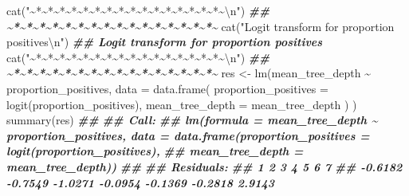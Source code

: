 \documentclass[
  11pt,
  oneside]{book}
\newenvironment{Shaded}{\begin{snugshade}}{\end{snugshade}}
\newcommand{\AttributeTok}[1]{\textcolor[rgb]{0.77,0.63,0.00}{#1}}
\newcommand{\DocumentationTok}[1]{\textcolor[rgb]{0.56,0.35,0.01}{\textbf{\textit{#1}}}}
\newcommand{\FunctionTok}[1]{\textcolor[rgb]{0.00,0.00,0.00}{#1}}
\newcommand{\NormalTok}[1]{#1}
\newcommand{\OtherTok}[1]{\textcolor[rgb]{0.56,0.35,0.01}{#1}}
\newcommand{\SpecialCharTok}[1]{\textcolor[rgb]{0.00,0.00,0.00}{#1}}
\newcommand{\StringTok}[1]{\textcolor[rgb]{0.31,0.60,0.02}{#1}}
\begin{document}
\begin{Shaded}
\begin{Highlighting}[]
\FunctionTok{cat}\NormalTok{(}\StringTok{"\textasciitilde{}*\textasciitilde{}*\textasciitilde{}*\textasciitilde{}*\textasciitilde{}*\textasciitilde{}*\textasciitilde{}*\textasciitilde{}*\textasciitilde{}*\textasciitilde{}*\textasciitilde{}*\textasciitilde{}*\textasciitilde{}*\textasciitilde{}*\textasciitilde{}*\textasciitilde{}*\textasciitilde{}}\SpecialCharTok{\textbackslash{}n}\StringTok{"}\NormalTok{)}
\DocumentationTok{\#\# \textasciitilde{}*\textasciitilde{}*\textasciitilde{}*\textasciitilde{}*\textasciitilde{}*\textasciitilde{}*\textasciitilde{}*\textasciitilde{}*\textasciitilde{}*\textasciitilde{}*\textasciitilde{}*\textasciitilde{}*\textasciitilde{}*\textasciitilde{}*\textasciitilde{}*\textasciitilde{}*\textasciitilde{}}
\FunctionTok{cat}\NormalTok{(}\StringTok{"Logit transform for proportion positives}\SpecialCharTok{\textbackslash{}n}\StringTok{"}\NormalTok{)}
\DocumentationTok{\#\# Logit transform for proportion positives}
\FunctionTok{cat}\NormalTok{(}\StringTok{"\textasciitilde{}*\textasciitilde{}*\textasciitilde{}*\textasciitilde{}*\textasciitilde{}*\textasciitilde{}*\textasciitilde{}*\textasciitilde{}*\textasciitilde{}*\textasciitilde{}*\textasciitilde{}*\textasciitilde{}*\textasciitilde{}*\textasciitilde{}*\textasciitilde{}*\textasciitilde{}*\textasciitilde{}}\SpecialCharTok{\textbackslash{}n}\StringTok{"}\NormalTok{)}
\DocumentationTok{\#\# \textasciitilde{}*\textasciitilde{}*\textasciitilde{}*\textasciitilde{}*\textasciitilde{}*\textasciitilde{}*\textasciitilde{}*\textasciitilde{}*\textasciitilde{}*\textasciitilde{}*\textasciitilde{}*\textasciitilde{}*\textasciitilde{}*\textasciitilde{}*\textasciitilde{}*\textasciitilde{}*\textasciitilde{}}
\NormalTok{res }\OtherTok{\textless{}{-}} \FunctionTok{lm}\NormalTok{(mean\_tree\_depth }\SpecialCharTok{\textasciitilde{}}\NormalTok{ proportion\_positives,}
  \AttributeTok{data =} \FunctionTok{data.frame}\NormalTok{(}
    \AttributeTok{proportion\_positives =} \FunctionTok{logit}\NormalTok{(proportion\_positives),}
    \AttributeTok{mean\_tree\_depth =}\NormalTok{ mean\_tree\_depth}
\NormalTok{  )}
\NormalTok{)}
\FunctionTok{summary}\NormalTok{(res)}
\DocumentationTok{\#\# }
\DocumentationTok{\#\# Call:}
\DocumentationTok{\#\# lm(formula = mean\_tree\_depth \textasciitilde{} proportion\_positives, data = data.frame(proportion\_positives = logit(proportion\_positives), }
\DocumentationTok{\#\#     mean\_tree\_depth = mean\_tree\_depth))}
\DocumentationTok{\#\# }
\DocumentationTok{\#\# Residuals:}
\DocumentationTok{\#\#       1       2       3       4       5       6       7 }
\DocumentationTok{\#\# {-}0.6182 {-}0.7549 {-}1.0271 {-}0.0954 {-}0.1369 {-}0.2818  2.9143 }

\end{Highlighting}
\end{Shaded}
\end{document}
